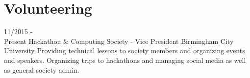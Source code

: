 \documentclass[]{friggeri-cv}
\begin{document}
\section{Volunteering}
    \begin{entrylist}
      \entry
    {11/2015 - \\ Present}
    {Hackathon \& Computing Society - Vice President}
    {Birmingham City University}
    {Providing technical lessons to society members and organizing events and speakers.  Organizing trips to hackathons and managing social media as well as general society admin. }
    \end{entrylist}
\end{document}
